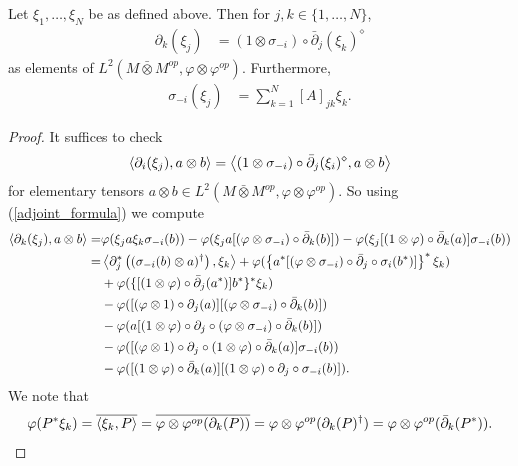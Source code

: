 \begin{lem}
Let $\xi_1,\ldots, \xi_N$ be as defined above. Then for $j,k\in\{1,\ldots, N\}$,
	\begin{align}\label{xi_has_positive_hessian}
		\partial_k(\xi_j)&=(1\otimes \sigma_{-i})\circ\bar{\partial}_j(\xi_k)^\diamond
	\end{align}
as elements of $L^2(M\bar{\otimes}M^{op},\varphi\otimes\varphi^{op})$. Furthermore,
	\begin{align}\label{xi_is_eigenvector}
		\sigma_{-i}(\xi_j)&=\sum_{k=1}^N [A]_{jk} \xi_k.
	\end{align}
\end{lem}
\begin{proof}
It suffices to check
	\begin{align*}
		\left\langle\partial_i(\xi_j), a\otimes b\right\rangle = \left\langle(1\otimes \sigma_{-i})\circ\bar{\partial}_j(\xi_i)^\diamond, a\otimes b\right\rangle
	\end{align*}
for elementary tensors $a\otimes b\in L^2(M\bar{\otimes}M^{op},\varphi\otimes\varphi^{op})$. So using (\ref{adjoint_formula}) we compute
	\begin{align*}
		\left\langle\partial_k(\xi_j), a\otimes b\right\rangle=&\varphi(\xi_j a\xi_k\sigma_{-i}(b)) - \varphi(\xi_ja[(\varphi\otimes\sigma_{-i})\circ\bar{\partial}_k(b)]) - \varphi(\xi_j[(1\otimes\varphi)\circ\bar{\partial}_k(a)]\sigma_{-i}(b))\\
							      =&\left\langle\partial_j^*\left( (\sigma_{-i}(b)\otimes a)^\dagger\right),\xi_k\right\rangle + \varphi( \left\{ a^*[(\varphi\otimes \sigma_{-i})\circ\bar{\partial}_j\circ\sigma_{i}(b^*)]\right\}^*\xi_k)\\
							      &+\varphi(\{[(1\otimes \varphi)\circ\bar{\partial}_j(a^*)]b^*\}^*\xi_k)\\
							      & - \varphi( [(\varphi\otimes 1)\circ\partial_j(a)][(\varphi\otimes\sigma_{-i})\circ\bar{\partial}_k(b)])\\
							      & - \varphi( a [(1\otimes \varphi)\circ\partial_j\circ(\varphi\otimes \sigma_{-i})\circ\bar{\partial}_k(b)])\\
							      &-\varphi([(\varphi\otimes 1)\circ\partial_j\circ(1\otimes \varphi)\circ\bar{\partial}_k(a)]\sigma_{-i}(b))\\
							      & - \varphi([(1\otimes \varphi)\circ\bar{\partial}_k(a)][(1\otimes\varphi)\circ\partial_j\circ\sigma_{-i}(b)]).
	\end{align*}
We note that
	\begin{align*}
		\varphi(P^*\xi_k)=\overline{\<\xi_k,P\>}=\overline{\varphi\otimes \varphi^{op}(\partial_k (P))}=\varphi\otimes\varphi^{op}(\partial_k(P)^\dagger)=\varphi\otimes\varphi^{op}(\bar{\partial}_k(P^*)).

\end{align*}
\end{proof}
